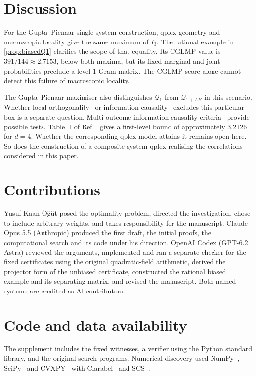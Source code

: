 \documentclass[11pt]{article}
\theoremstyle{definition}
\newcommand{\qone}{\mathcal{Q}_1}
\newcommand{\qab}{\mathcal{Q}_{1+AB}}
\begin{document}
\section{Discussion}

For the Gupta--Pienaar single-system construction, qplex geometry and macroscopic locality
give the same maximum of $I_3$. The rational example in \cref{prop:biasedQ1} clarifies the
scope of that equality. Its CGLMP value is $391/144\approx2.7153$, below both maxima,
but its fixed marginal and joint probabilities preclude a level-1 Gram matrix. The CGLMP
score alone cannot detect this failure of macroscopic locality.

The Gupta--Pienaar maximiser also distinguishes $\qone$ from $\qab$ in this scenario.
Whether local orthogonality~\cite{Fritz2013} or information causality~\cite{Pawlowski2009}
excludes this particular box is a separate question. Multi-outcome information-causality
criteria~\cite{Gachechiladze2022} provide possible tests.
Table~1 of Ref.~\cite{NPA2008} gives a first-level bound of approximately $3.2126$ for
$d=4$. Whether the corresponding qplex model attains it remains open here. So does the
construction of a composite-system qplex realising the correlations considered in this paper.

\section*{Contributions}
Yusuf Kaan Öğüt posed the optimality problem, directed the investigation, chose to include
arbitrary weights, and takes responsibility for the manuscript. Claude Opus 5.5 (Anthropic)
produced the first draft, the initial proofs, the computational search and its code under his direction.
OpenAI Codex (GPT-6.2 Astra) reviewed the arguments, implemented and ran a separate checker
for the fixed certificates using the original quadratic-field arithmetic, derived the projector
form of the unbiased certificate, constructed the rational biased example and its separating
matrix, and revised the manuscript. Both named systems are credited as AI contributors.

\section*{Code and data availability}
The supplement includes the fixed witnesses, a verifier using the Python standard library,
and the original search programs. Numerical discovery used NumPy~\cite{NumPy2020},
SciPy~\cite{SciPy2020} and CVXPY~\cite{CVXPY2016} with Clarabel~\cite{Clarabel2024}
and SCS~\cite{SCS2016}.
\end{document}
